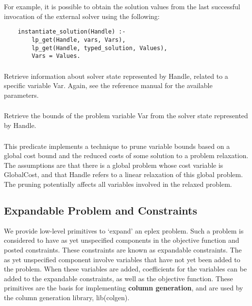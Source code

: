 For example, it is possible to obtain the solution values from the last
successful invocation of the external solver using the following:

    \begin{verbatim}
    instantiate_solution(Handle) :-
        lp_get(Handle, vars, Vars),
        lp_get(Handle, typed_solution, Values),
        Vars = Values.
    \end{verbatim}


\subsubsection{}
Retrieve information about solver state represented by Handle,
related to a specific variable Var. Again, see the reference manual for the
available parameters.

\subsubsection{}
Retrieve the bounds of the problem variable Var from the solver state
represented by Handle. 

\subsubsection{}
This predicate implements a technique to prune variable bounds
based on a global cost bound and the reduced costs of some solution to
a problem relaxation.  The assumptions are that there is a global
problem whose cost variable is GlobalCost, and that Handle refers to
a linear relaxation of this global problem.
The pruning potentially affects all variables involved in the relaxed
problem.

\subsection{Expandable Problem and Constraints}
\label{coladd}

We provide low-level primitives to `expand' an eplex problem. Such a problem is
considered to have as yet unspecified components in the objective function
and posted constraints. These constraints are known as expandable constraints.
The as yet unspecified component involve variables
that have not yet been added to the problem. When these variables are
added, coefficients for the variables can be added to the expandable
constraints, as well as the objective function. These primitives are the
basis for implementing {\bf column generation}, and are used by the column
generation library, lib(colgen). 

